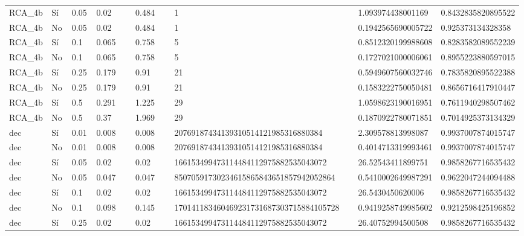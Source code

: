 {{\begin{longtable}{M{0.09\linewidth}M{0.09\linewidth}M{0.09\linewidth}M{0.09\linewidth}M{0.09\linewidth}M{0.09\linewidth}M{0.09\linewidth}M{0.09\linewidth}M{0.09\linewidth}M{0.09\linewidth}M{0.09\linewidth}}
RCA\_4b & Sí & \num{0.05} & \num{0.02} &   & \num{0.484} &   & \num{1} &   & \num{1.093974438001169} & \num{0.8432835820895522} \\
RCA\_4b & No & \num{0.05} & \num{0.02} &   & \num{0.484} &   & \num{1} &   & \num{0.1942565690005722} & \num{0.925373134328358} \\
RCA\_4b & Sí & \num{0.1} & \num{0.065} &   & \num{0.758} &   & \num{5} &   & \num{0.8512320199988608} & \num{0.8283582089552239} \\
RCA\_4b & No & \num{0.1} & \num{0.065} &   & \num{0.758} &   & \num{5} &   & \num{0.1727021000006061} & \num{0.8955223880597015} \\
RCA\_4b & Sí & \num{0.25} & \num{0.179} &   & \num{0.91} &   & \num{21} &   & \num{0.5949607560032746} & \num{0.7835820895522388} \\
RCA\_4b & No & \num{0.25} & \num{0.179} &   & \num{0.91} &   & \num{21} &   & \num{0.1583222750050481} & \num{0.8656716417910447} \\
RCA\_4b & Sí & \num{0.5} & \num{0.291} &   & \num{1.225} &   & \num{29} &   & \num{1.0598623190016951} & \num{0.7611940298507462} \\
RCA\_4b & No & \num{0.5} & \num{0.37} &   & \num{1.969} &   & \num{29} &   & \num{0.1870922780071851} & \num{0.7014925373134329} \\
dec & Sí & \num{0.01} & \num{0.008} &   & \num{0.008} &   & \num{20769187434139310514121985316880384} &   & \num{2.309578813998087} & \num{0.9937007874015747} \\
dec & No & \num{0.01} & \num{0.008} &   & \num{0.008} &   & \num{20769187434139310514121985316880384} &   & \num{0.4014713319993461} & \num{0.9937007874015747} \\
dec & Sí & \num{0.05} & \num{0.02} &   & \num{0.02} &   & \num{166153499473114484112975882535043072} &   & \num{26.52543411899751} & \num{0.9858267716535432} \\
dec & No & \num{0.05} & \num{0.047} &   & \num{0.047} &   & \num{85070591730234615865843651857942052864} &   & \num{0.5410002649987291} & \num{0.9622047244094488} \\
dec & Sí & \num{0.1} & \num{0.02} &   & \num{0.02} &   & \num{166153499473114484112975882535043072} &   & \num{26.5430450620006} & \num{0.9858267716535432} \\
dec & No & \num{0.1} & \num{0.098} &   & \num{0.145} &   & \num{170141183460469231731687303715884105728} &   & \num{0.9419258749985602} & \num{0.9212598425196852} \\
dec & Sí & \num{0.25} & \num{0.02} &   & \num{0.02} &   & \num{166153499473114484112975882535043072} &   & \num{26.40752994500508} & \num{0.9858267716535432} \\

\end{longtable}}}
